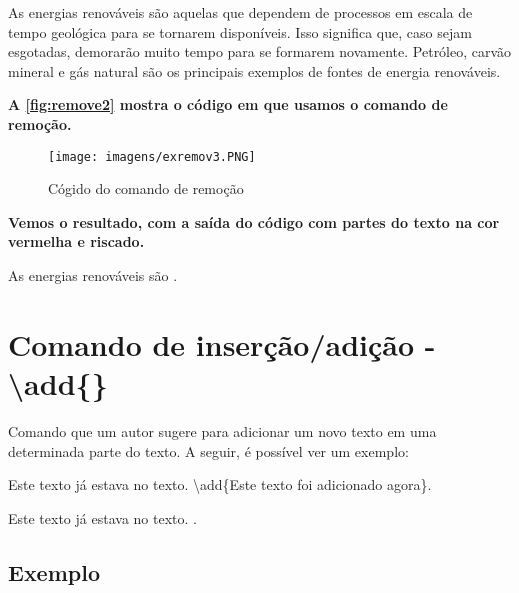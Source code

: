 \documentclass[12pt,openright,oneside,a4paper,sumario=tradicional,brazil]{abntex2}
\begin{document}
\begin{center}
\justifying
    As energias renováveis são aquelas que dependem de processos em escala de tempo geológica para se tornarem disponíveis. Isso significa que, caso sejam esgotadas, demorarão muito tempo para se formarem novamente. Petróleo, carvão mineral e gás natural são os principais exemplos de fontes de energia renováveis. 
\end{center}

\textbf{A \autoref{fig:remove2} mostra o código em que usamos o comando de remoção.}

\begin{figure}[htp]
\caption{Cógido do comando de remoção}
        \centering
        \texttt{[image: imagens/exremov3.PNG]}
\label{fig:remove2}
\end{figure}

\textbf{Vemos o resultado, com a saída do código com partes do texto na cor vermelha e riscado.}

\begin{center}
    \justifying
    As energias renováveis são .
\end{center}

\section{Comando de inserção/adição - \textbackslash add\{\}}
Comando que um autor sugere para adicionar um novo texto em uma determinada parte do texto. A seguir, é possível ver um exemplo:\\

\begin{minipage}{0.45\textwidth}
Este texto já estava no texto. \textbackslash add\{Este texto foi adicionado agora\}.
\end{minipage}\hfill
\begin{minipage}{0.45\textwidth}
Este texto já estava no texto. .
\end{minipage}

\subsection{Exemplo}
\end{document}
